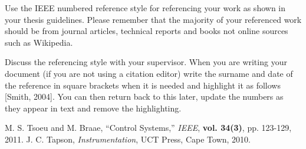 Use the IEEE numbered reference style for referencing your work as shown in your thesis guidelines.
Please remember that the majority of your referenced work should be from journal articles, technical
reports and books not online sources such as Wikipedia.

Discuss the referencing style with your supervisor. When you are writing your document (if you are not using a citation editor) write the surname and date of the reference in square brackets when it is needed and highlight it as follows [Smith, 2004]. You can then return back to this later, update the numbers as they appear in text and remove the highlighting.

\begin{thebibliography}{5}
	 M. S. Tsoeu and M. Braae, ``Control Systems,'' \emph{IEEE}, {\bf vol. 34(3)}, pp. 123-129, 2011.
	 J. C. Tapson, \emph{Instrumentation}, UCT Press, Cape Town, 2010.
\end{thebibliography}
